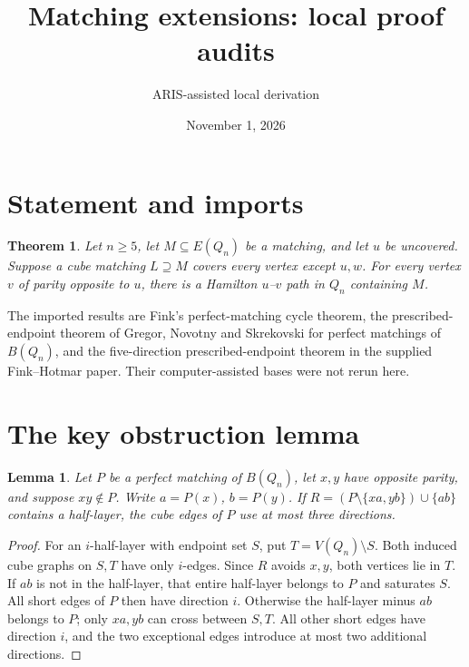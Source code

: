 \documentclass[11pt]{article}
\title{Matching extensions: local proof audits}
\author{ARIS-assisted local derivation}
\date{November 1, 2026}
\newtheorem{lemma}{Lemma}
\newtheorem{theorem}{Theorem}
\newcommand{\Q}{Q_n}
\begin{document}
\maketitle
\noindent{}

\section*{Statement and imports}
\begin{theorem}
Let $n\ge5$, let $M\subseteq E(\Q)$ be a matching, and let $u$ be uncovered.
Suppose a cube matching $L\supseteq M$ covers every vertex except $u,w$.
For every vertex $v$ of parity opposite to $u$, there is a Hamilton $u$--$v$
path in $\Q$ containing $M$.
\end{theorem}
The imported results are Fink's perfect-matching cycle theorem, the
prescribed-endpoint theorem of Gregor, Novotny and Skrekovski for perfect matchings
of $B(\Q)$, and the five-direction prescribed-endpoint theorem in the supplied
Fink--Hotmar paper. Their computer-assisted bases were not rerun here.

\section*{The key obstruction lemma}
\begin{lemma}
Let $P$ be a perfect matching of $B(\Q)$, let $x,y$ have opposite parity, and
suppose $xy\notin P$. Write $a=P(x)$, $b=P(y)$. If
$R=(P\setminus\{xa,yb\})\cup\{ab\}$ contains a half-layer, the cube edges of
$P$ use at most three directions.
\end{lemma}
\begin{proof}
For an $i$-half-layer with endpoint set $S$, put $T=V(\Q)\setminus S$.
Both induced cube graphs on $S,T$ have only $i$-edges. Since $R$ avoids $x,y$,
both vertices lie in $T$. If $ab$ is not in the half-layer, that entire
half-layer belongs to $P$ and saturates $S$. All short edges of $P$ then have
direction $i$. Otherwise the half-layer minus $ab$ belongs to $P$; only
$xa,yb$ can cross between $S,T$. All other short edges have direction $i$,
and the two exceptional edges introduce at most two additional directions.
\end{proof}
\end{document}
